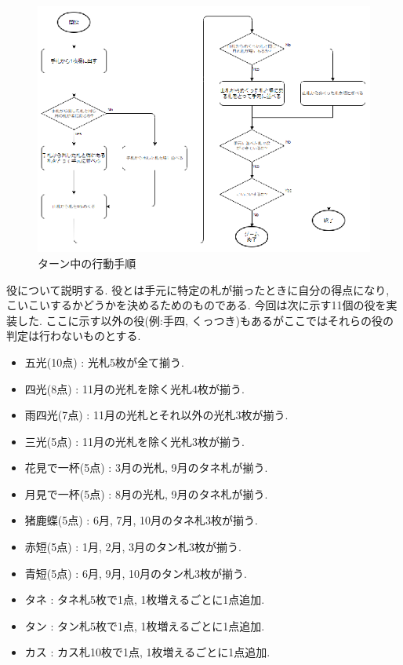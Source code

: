 \documentclass[a4j]{jarticle}
\begin{document}
      \begin{figure}[H]
      \centering
      \includegraphics[scale=1.8]{./img/turn-flow.eps}
      \caption{ターン中の行動手順}
      \label{turn-flow}
      \end{figure}

      役について説明する. 役とは手元に特定の札が揃ったときに自分の得点になり, こいこいするかどうかを決めるためのものである. 今回は次に示す11個の役を実装した. 
      ここに示す以外の役(例:手四, くっつき)もあるがここではそれらの役の判定は行わないものとする.
      \begin{itemize}
        \item 五光(10点) : 光札5枚が全て揃う.
        \item 四光(8点) : 11月の光札を除く光札4枚が揃う.
        \item 雨四光(7点) : 11月の光札とそれ以外の光札3枚が揃う.
        \item 三光(5点) : 11月の光札を除く光札3枚が揃う.
        \item 花見で一杯(5点) : 3月の光札, 9月のタネ札が揃う.
        \item 月見で一杯(5点) : 8月の光札, 9月のタネ札が揃う.
        \item 猪鹿蝶(5点) : 6月, 7月, 10月のタネ札3枚が揃う.
        \item 赤短(5点) : 1月, 2月, 3月のタン札3枚が揃う.
        \item 青短(5点) : 6月, 9月, 10月のタン札3枚が揃う.
        \item タネ : タネ札5枚で1点, 1枚増えるごとに1点追加.
        \item タン : タン札5枚で1点, 1枚増えるごとに1点追加.
        \item カス : カス札10枚で1点, 1枚増えるごとに1点追加.
      \end{itemize}
      
\end{document}
